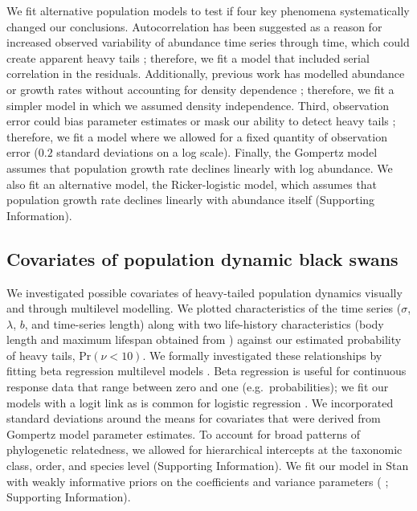 We fit alternative population models to test if four key phenomena
systematically changed our conclusions. Autocorrelation has been suggested as
a reason for increased observed variability of abundance time series through
time, which could create apparent heavy tails \citep{inchausti2002};
therefore, we fit a model that included serial correlation in the residuals.
Additionally, previous work has modelled abundance or growth rates without
accounting for density dependence \citep{halley2002,segura2013}; therefore, we
fit a simpler model in which we assumed density independence. Third,
observation error could bias parameter estimates \citep{knape2012} or mask our
ability to detect heavy tails \citep{ward2007}; therefore, we fit a model
where we allowed for a fixed quantity of observation error ($0.2$ standard
deviations on a log scale). Finally, the Gompertz model assumes that
population growth rate declines linearly with log abundance. We also fit an
alternative model, the Ricker-logistic model, which assumes that population
growth rate declines linearly with abundance itself (Supporting Information).

\subsection{Covariates of population dynamic black swans}

We investigated possible covariates of heavy-tailed population dynamics
visually and through multilevel modelling. We plotted characteristics of the
time series ($\sigma$, $\lambda$, $b$, and time-series length) along with two
life-history characteristics (body length and maximum lifespan obtained from
\citet{brook2006a}) against our estimated probability of heavy tails, Pr$(\nu <
10)$. We formally investigated these relationships by fitting beta
regression multilevel models \citep{ferrari2004}. Beta regression is useful
for continuous response data that range between zero and one (e.g.\
probabilities); we fit our models with a logit link as is common for logistic
regression \citep{ferrari2004}. We incorporated standard deviations around the
means for covariates that were derived from Gompertz model parameter
estimates. To account for broad patterns of phylogenetic relatedness, we
allowed for hierarchical intercepts at the taxonomic class, order, and species
level (Supporting Information). We fit our model in Stan with weakly
informative priors on the coefficients \citep{gelman2008d} and variance
parameters (\citeauthor{gelman2006c} \citeyear{gelman2006c}
\citeauthor{gelman2014} \citeyear{gelman2014}; Supporting Information).

